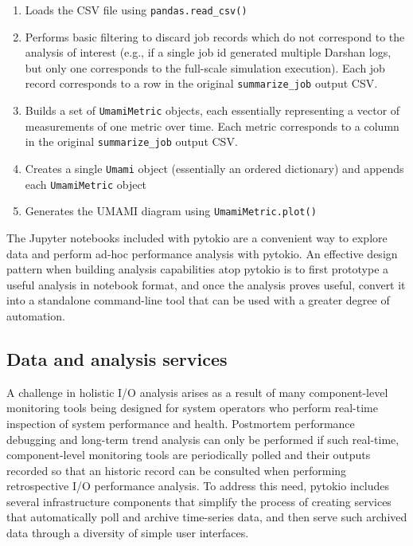 \begin{enumerate}[leftmargin=*]
\item Loads the CSV file using \texttt{pandas.read\_csv()}
\item Performs basic filtering to discard job records which do not correspond to the analysis of interest (e.g., if a single job id generated multiple Darshan logs, but only one corresponds to the full-scale simulation execution).  Each job record corresponds to a row in the original \texttt{summarize\_job} output CSV.
\item Builds a set of \texttt{UmamiMetric} objects, each essentially representing a vector of measurements of one metric over time.  Each metric corresponds to a column in the original \texttt{summarize\_job} output CSV.
\item Creates a single \texttt{Umami} object (essentially an ordered dictionary) and appends each \texttt{UmamiMetric} object
\item Generates the UMAMI diagram using \texttt{UmamiMetric.plot()}
\end{enumerate}

The Jupyter notebooks included with pytokio are a convenient way to explore data and perform ad-hoc performance analysis with pytokio.
An effective design pattern when building analysis capabilities atop pytokio is to first prototype a useful analysis in notebook format, and once the analysis proves useful, convert it into a standalone command-line tool that can be used with a greater degree of automation.

\subsection{Data and analysis services} \label{sec:apps/services}

A challenge in holistic I/O analysis arises as a result of many component-level monitoring tools being designed for system operators who perform real-time inspection of system performance and health.
Postmortem performance debugging and long-term trend analysis can only be performed if such real-time, component-level monitoring tools are periodically polled and their outputs recorded so that an historic record can be consulted when performing retrospective I/O performance analysis.
To address this need, pytokio includes several infrastructure components that simplify the process of creating services that automatically poll and archive time-series data, and then serve such archived data through a diversity of simple user interfaces.

